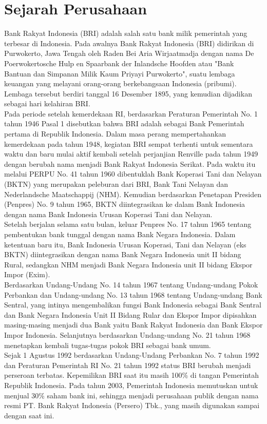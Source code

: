 \section{Sejarah Perusahaan}
\tab Bank Rakyat Indonesia (BRI) adalah salah satu bank milik pemerintah yang terbesar di Indonesia. Pada awalnya Bank Rakyat Indonesia (BRI) didirikan di Purwokerto, Jawa Tengah oleh Raden Bei Aria Wirjaatmadja dengan nama De Poerwokertosche Hulp en Spaarbank der Inlandsche Hoofden atau "Bank Bantuan dan Simpanan Milik Kaum Priyayi Purwokerto", suatu lembaga keuangan yang melayani orang-orang berkebangsaan Indonesia (pribumi). Lembaga tersebut berdiri tanggal 16 Desember 1895, yang kemudian dijadikan sebagai hari kelahiran BRI.\\
\tab Pada periode setelah kemerdekaan RI, berdasarkan Peraturan Pemerintah No. 1 tahun 1946 Pasal 1 disebutkan bahwa BRI adalah sebagai Bank Pemerintah pertama di Republik Indonesia. Dalam masa perang mempertahankan kemerdekaan pada tahun 1948, kegiatan BRI sempat terhenti untuk sementara waktu dan baru mulai aktif kembali setelah perjanjian Renville pada tahun 1949 dengan berubah nama menjadi Bank Rakyat Indonesia Serikat. Pada waktu itu melalui PERPU No. 41 tahun 1960 dibentuklah Bank Koperasi Tani dan Nelayan (BKTN) yang merupakan peleburan dari BRI, Bank Tani Nelayan dan Nederlandsche Maatschappij (NHM). Kemudian berdasarkan Penetapan Presiden (Penpres) No. 9 tahun 1965, BKTN diintegrasikan ke dalam Bank Indonesia dengan nama Bank Indonesia Urusan Koperasi Tani dan Nelayan.\\
\tab Setelah berjalan selama satu bulan, keluar Penpres No. 17 tahun 1965 tentang pembentukan bank tunggal dengan nama Bank Negara Indonesia. Dalam ketentuan baru itu, Bank Indonesia Urusan Koperasi, Tani dan Nelayan (eks BKTN) diintegrasikan dengan nama Bank Negara Indonesia unit II bidang Rural, sedangkan NHM menjadi Bank Negara Indonesia unit II bidang Ekspor Impor (Exim).\\
\tab Berdasarkan Undang-Undang No. 14 tahun 1967 tentang Undang-undang Pokok Perbankan dan Undang-undang No. 13 tahun 1968 tentang Undang-undang Bank Sentral, yang intinya mengembalikan fungsi Bank Indonesia sebagai Bank Sentral dan Bank Negara Indonesia Unit II Bidang Rular dan Ekspor Impor dipisahkan masing-masing menjadi dua Bank yaitu Bank Rakyat Indonesia dan Bank Ekspor Impor Indonesia. Selanjutnya berdasarkan Undang-undang No. 21 tahun 1968 menetapkan kembali tugas-tugas pokok BRI sebagai bank umum.\\
\tab Sejak 1 Agustus 1992 berdasarkan Undang-Undang Perbankan No. 7 tahun 1992 dan Peraturan Pemerintah RI No. 21 tahun 1992 status BRI berubah menjadi perseroan terbatas. Kepemilikan BRI saat itu masih 100\% di tangan Pemerintah Republik Indonesia. Pada tahun 2003, Pemerintah Indonesia memutuskan untuk menjual 30\% saham bank ini, sehingga menjadi perusahaan publik dengan nama resmi PT. Bank Rakyat Indonesia (Persero) Tbk., yang masih digunakan sampai dengan saat ini\cite{bri}.

